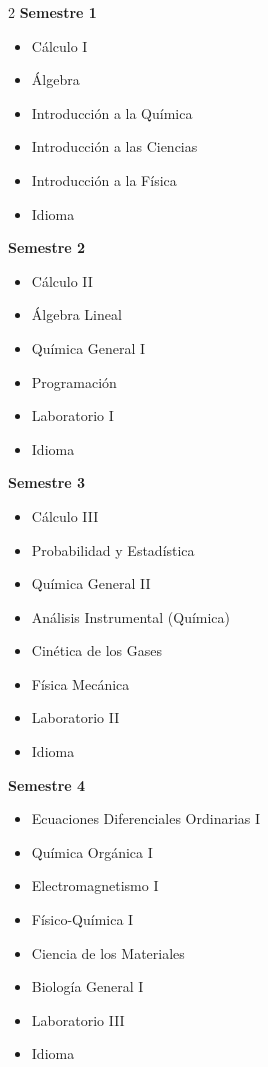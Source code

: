 \documentclass[12pt,a4paper]{article}
\begin{document}
	\begin{multicols}{2}
		\textbf{Semestre 1}
		\begin{itemize}
			\item Cálculo I
			\item Álgebra
			\item Introducción a la Química
			\item Introducción a las Ciencias
			\item Introducción a la Física
			\item Idioma
		\end{itemize}
		
		\textbf{Semestre 2}
		\begin{itemize}
			\item Cálculo II
			\item Álgebra Lineal
			\item Química General I
			\item Programación
			\item Laboratorio I
			\item Idioma
		\end{itemize}
		
		\textbf{Semestre 3}
		\begin{itemize}
			\item Cálculo III
			\item Probabilidad y Estadística
			\item Química General II
			\item Análisis Instrumental (Química)
			\item Cinética de los Gases
			\item Física Mecánica
			\item Laboratorio II
			\item Idioma
		\end{itemize}
		
		\textbf{Semestre 4}
		\begin{itemize}
			\item Ecuaciones Diferenciales Ordinarias I
			\item Química Orgánica I
			\item Electromagnetismo I
			\item Físico-Química I
			\item Ciencia de los Materiales
			\item Biología General I
			\item Laboratorio III
			\item Idioma
		\end{itemize}
		

\end{multicols}
\end{document}
